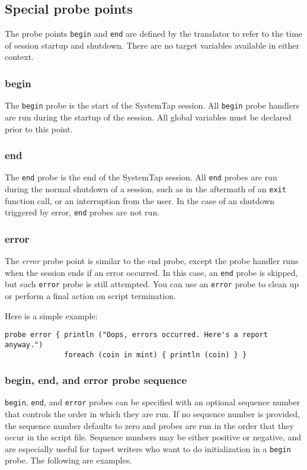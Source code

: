 \documentclass[twoside,english]{article}
\newenvironment{vindent}
{\begin{list}{}{\setlength{\listparindent}{6pt}}
\item[]}
{\end{list}}
\begin{document}
\subsection{Special probe points}

The probe points \texttt{begin} and \texttt{end} are defined by the translator
to refer to the time of session startup and shutdown. There are no target
variables available in either context.


\subsubsection{begin}
The \texttt{begin} probe is the start of the SystemTap session. All \texttt{begin}
probe handlers are run during the startup of the session. All global variables
must be declared prior to this point.


\subsubsection{end}
The \texttt{end} probe is the end of the SystemTap session. All \texttt{end}
probes are run during the normal shutdown of a session, such as in the aftermath
of an \texttt{exit} function call, or an interruption from the user. In the
case of an shutdown triggered by error, \texttt{end} probes are not run.


\subsubsection{error}
The \emph{error} probe point is similar to the end
probe, except the probe handler runs when the session ends if an error
occurred.  In this case, an \texttt{end} probe is skipped, but each
\texttt{error} probe is still attempted.  You can use an
\texttt{error} probe to clean up or perform a final action on script
termination.

Here is a simple example:
\begin{vindent}
\begin{verbatim}
probe error { println ("Oops, errors occurred. Here's a report anyway.")
              foreach (coin in mint) { println (coin) } }
\end{verbatim}
\end{vindent}


\subsubsection{begin, end, and error probe sequence}
\texttt{begin}, \texttt{end}, and \texttt{error} probes can be
specified with an optional sequence number that controls the order in
which they are run. If no sequence number is provided, the sequence
number defaults to zero and probes are run in the order that they
occur in the script file. Sequence numbers may be either positive or
negative, and are especially useful for tapset writers who want to do
initialization in a \texttt{begin} probe. The following are examples.
\end{document}
